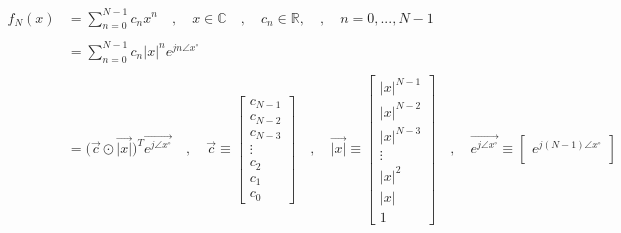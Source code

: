 \documentclass{article}
\begin{document}
\begin{align*}
    f_{N}(x)&= \sum^{N - 1}_{n = 0}c_{n}x^{n} \quad , \quad x \in \mathbb{C} \quad , \quad c_n \in \mathbb{R}, \quad , \quad n = 0, ..., N - 1 \\ \\
            &= \sum^{N - 1}_{n = 0}c_{n}|x|^{n}e^{jn\angle{x}^{\circ}} \\ \\
            &= \Big(\vec{c} \odot \vec{|x|}\Big)^{T}\vec{e^{j\angle{x}^{\circ}}} \quad , \quad
                                     \vec{c} \equiv \begin{bmatrix}
                                                        c_{N - 1} \\
                                                        c_{N - 2} \\
                                                        c_{N - 3} \\
                                                        \vdots \\
                                                        c_{2} \\
                                                        c_{1} \\
                                                        c_{0}
                                                      \end{bmatrix} \quad , \quad
                                   \vec{|x|} \equiv \begin{bmatrix}
                                                        |x|^{N - 1} \\
                                                        |x|^{N - 2} \\
                                                        |x|^{N - 3} \\
                                                        \vdots \\
                                                        |x|^{2} \\
                                                        |x| \\
                                                        1
                                                      \end{bmatrix} \quad , \quad
                \vec{e^{j\angle{x}^{\circ}}} \equiv \begin{bmatrix}
                                                        e^{j(N - 1)\angle{x}^{\circ}} \\

\end{bmatrix}
\end{align*}
\end{document}
